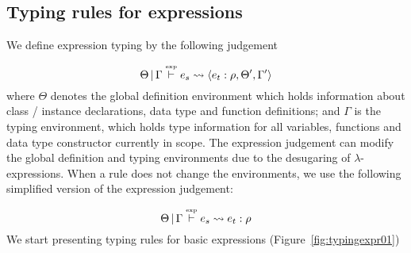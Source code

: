 \documentclass[a4paper, 11pt]{article}
\begin{document}
\subsection{Typing rules for expressions} 

We define expression typing by the following judgement 

\[
  \Theta\,|\,\Gamma \overset{\text{\tiny{exp}}}{\vdash} e_s \leadsto \langle e_t : \rho, \Theta' , \Gamma' \rangle  
\]
where $\Theta$ denotes the global definition environment which 
holds information about class / instance declarations, 
data type and  function definitions; and $\Gamma$ is 
the typing environment, which holds type information for 
all variables, functions and data type constructor currently 
in scope. The expression judgement can modify the 
global definition and typing environments due to the 
desugaring of $\lambda$-expressions. When a rule does not change 
the environments, we use the following simplified version 
of the expression judgement:

\[
  \Theta\,|\,\Gamma \overset{\text{\tiny{exp}}}{\vdash} e_s \leadsto e_t : \rho
\]
We start presenting typing rules for basic expressions 
(Figure~\ref{fig:typingexpr01})
\end{document}
